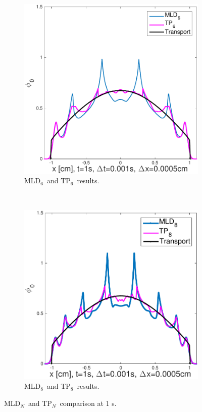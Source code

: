 \documentclass[review]{elsarticle}
\newcommand{\pn}{P$_N$}
\newcommand{\dn}{D$_N$}
\begin{document}
\begin{figure}[ht!]
	\begin{subfigure}{.5\textwidth}
		\centering
		\hspace*{-1cm}\includegraphics[width=1.\linewidth]{ml_fl6_1s2.pdf}
		\caption{MLD$_6$\ and TP$_6$\ results.}
		\label{f:mlfl7}
	\end{subfigure}
	~
	\begin{subfigure}{.5\textwidth}
		\centering
		\includegraphics[width=1.\linewidth]{fl9_ml2.pdf}
		\caption{MLD$_8$\ and TP$_8$\ results.}
		\label{f:mlfl9}
	\end{subfigure}
	\caption{ML\dn\ and T\pn\ comparison at 1 s.}
	\label{mlfls}
\end{figure}
\end{document}
